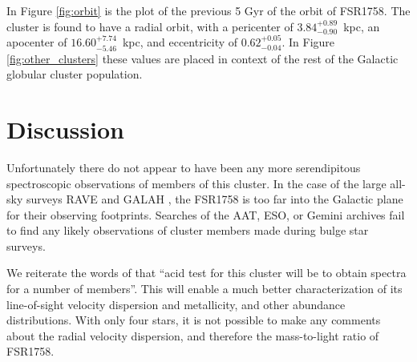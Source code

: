 \documentclass[fleqn,usenatbib,letters]{mnras}
\begin{document}
In Figure \ref{fig:orbit} is the plot of the previous 5 Gyr of the orbit of FSR1758. The cluster is found to have a radial orbit, with a pericenter of $3.84_{-0.90}^{+0.89}$~kpc, an apocenter of $16.60_{-5.46}^{+7.74}$~kpc, and eccentricity of $0.62_{-0.04}^{+0.05}$. In Figure \ref{fig:other_clusters} these values are placed in context of the rest of the Galactic globular cluster population.




\section{Discussion}

Unfortunately there do not appear to have been any more serendipitous spectroscopic observations of members of this cluster. In the case of the large all-sky surveys RAVE \citep{Kunder:2017gp} and GALAH \citep{DeSilva:2015gr,Buder2018}, the FSR1758 is too far into the Galactic plane for their observing footprints. Searches of the AAT, ESO, or Gemini archives fail to find any likely observations of cluster members made during bulge star surveys.

We reiterate the words of \citet{Barba2018} that ``acid test for this cluster will be to obtain spectra for a number of members''. This will enable a much better characterization of its line-of-sight velocity dispersion and metallicity, and other abundance distributions. With only four stars, it is not possible to make any comments about the radial velocity dispersion, and therefore the mass-to-light ratio of FSR1758.
\end{document}
